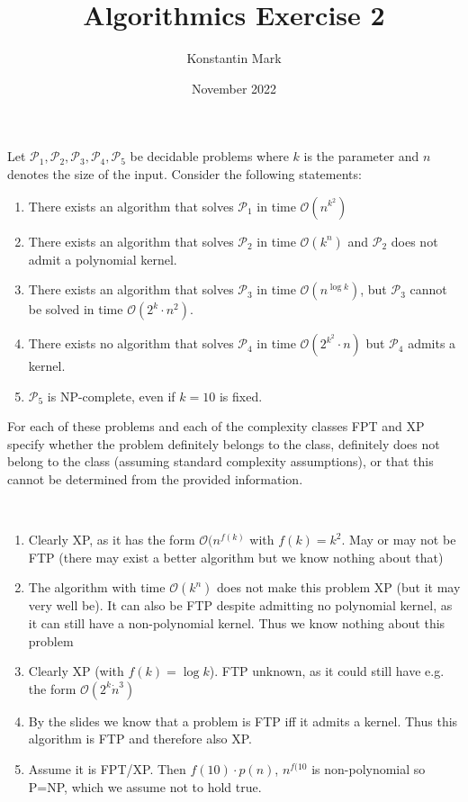 \documentclass{article}
\title{Algorithmics Exercise 2}
\author{Konstantin Mark}
\date{November 2022}
\begin{document}
\maketitle


\listoftheorems[ignoreall,show={exercise}]

\newpage

\begin{exercise}
    Let $\mathcal P_1, \mathcal P_2, \mathcal P_3, \mathcal P_4, \mathcal P_5$ be decidable problems where $k$ is the parameter and $n$ denotes the size of the input. Consider the following statements:
    \begin{enumerate}
        \item There exists an algorithm that solves $\mathcal P_1$ in time $\mathcal O (n^{k^2})$
        \item There exists an algorithm that solves $\mathcal P_2$ in time $\mathcal O(k^n)$ and $\mathcal P_2$ does not admit a polynomial kernel.
        \item There exists an algorithm that solves $\mathcal P_3$ in time $\mathcal O(n^{\log k})$, but $\mathcal P_3$ cannot be solved in time $\mathcal O(2^k\cdot n^2)$.
        \item There exists no algorithm that solves $\mathcal P_4$ in time $\mathcal O(2^{k^2}\cdot n)$ but $\mathcal P_4$ admits a kernel.
        \item $\mathcal P_5$ is NP-complete, even if $k=10$ is fixed.
    \end{enumerate}
    For each of these problems and each of the complexity classes FPT and XP specify whether the problem definitely belongs to the class, definitely does not belong to the class (assuming standard complexity assumptions), or that this cannot be determined from the provided information.
\end{exercise}
\begin{solving}~
    \begin{enumerate}
        \item Clearly XP, as it has the form $\mathcal O(n^{f(k)}$ with $f(k) = k^2$. May or may not be FTP (there may exist a better algorithm but we know nothing about that)
        \item The algorithm with time $\mathcal O(k^n)$ does not make this problem XP (but it may very well be). It can also be FTP despite admitting no polynomial kernel, as it can still have a non-polynomial kernel. Thus we know nothing about this problem
        \item Clearly XP (with $f(k) = \log k$). FTP unknown, as it could still have e.g. the form $\mathcal O(2^k\dot n^3)$
        \item By the slides we know that a problem is FTP iff it admits a kernel. Thus this algorithm is FTP and therefore also XP.
        \item Assume it is FPT/XP. Then $f(10)\cdot p(n)$, $n^{f(10}$ is non-polynomial so P=NP, which we assume not to hold true.
    \end{enumerate}
\end{solving}
\newpage
\end{document}
